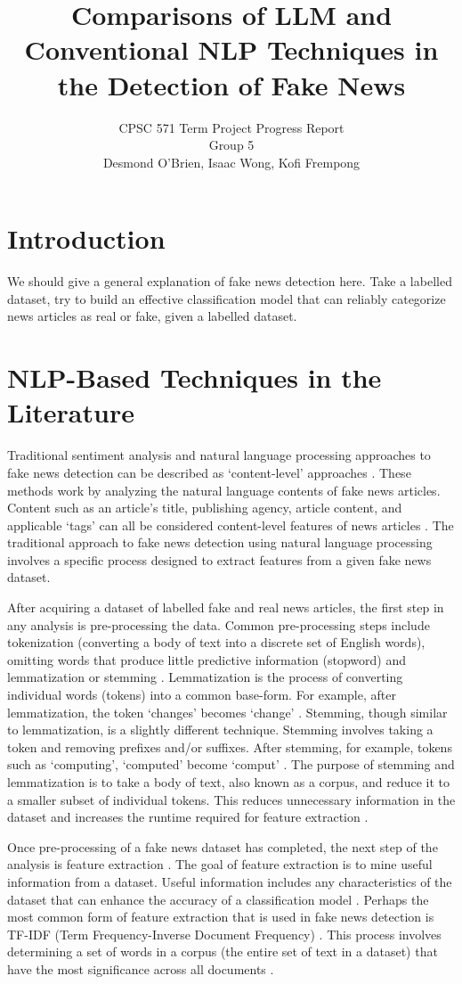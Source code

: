 \documentclass[twocolumn,10pt]{article}
\title{Comparisons of LLM and Conventional NLP Techniques in the Detection of Fake News}
\author{CPSC 571 Term Project Progress Report \\ Group 5 \\ Desmond O’Brien, Isaac Wong, Kofi Frempong}
\date{}
\begin{document}
\maketitle

\section*{Introduction}
We should give a general explanation of fake news detection here. Take a labelled dataset, try to build an effective classification model that can reliably categorize news articles as real or fake, given a labelled dataset.

\section{NLP-Based Techniques in the Literature}
Traditional sentiment analysis and natural language processing approaches to fake news detection can be described as ‘content-level’ approaches \cite{1}. These methods work by analyzing the natural language contents of fake news articles. Content such as an article’s title, publishing agency, article content, and applicable ‘tags’ can all be considered content-level features of news articles \cite{1}. The traditional approach to fake news detection using natural language processing involves a specific process designed to extract features from a given fake news dataset.

After acquiring a dataset of labelled fake and real news articles, the first step in any analysis is pre-processing the data. Common pre-processing steps include tokenization (converting a body of text into a discrete set of English words), omitting words that produce little predictive information (stopword) and lemmatization or stemming \cite{1}. Lemmatization is the process of converting individual words (tokens) into a common base-form. For example, after lemmatization, the token ‘changes’ becomes ‘change’ \cite{2}. Stemming, though similar to lemmatization, is a slightly different technique. Stemming involves taking a token and removing prefixes and/or suffixes. After stemming, for example, tokens such as ‘computing’, ‘computed' become ‘comput’ \cite{2}. The purpose of stemming and lemmatization is to take a body of text, also known as a corpus, and reduce it to a smaller subset of individual tokens. This reduces unnecessary information in the dataset and increases the runtime required for feature extraction \cite{2}.

Once pre-processing of a fake news dataset has completed, the next step of the analysis is feature extraction \cite{1}. The goal of feature extraction is to mine useful information from a dataset. Useful information includes any characteristics of the dataset that can enhance the accuracy of a classification model \cite{2}. Perhaps the most common form of feature extraction that is used in fake news detection is TF-IDF (Term Frequency-Inverse Document Frequency) \cite{1,2}. This process involves determining a set of words in a corpus (the entire set of text in a dataset) that have the most significance across all documents \cite{1}. 
\end{document}
